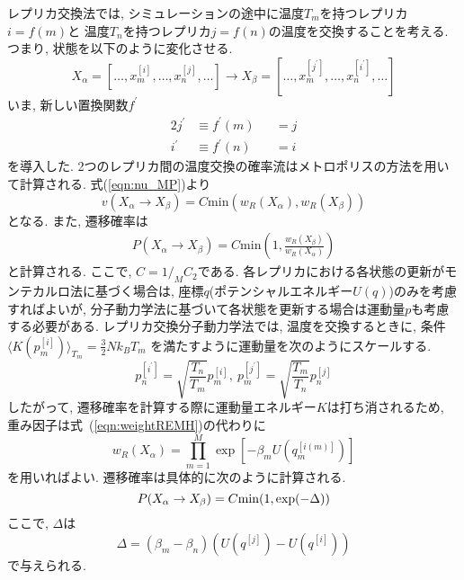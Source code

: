 レプリカ交換法では, シミュレーションの途中に温度$T_{m}$を持つレプリカ$i=f(m)$と
温度$T_{n}$を持つレプリカ$j=f(n)$の温度を交換することを考える.
つまり, 状態を以下のように変化させる.
\begin{equation}
  X_{\alpha} = [\dots, x_{m}^{[i]},\dots, x_{n}^{[j]}, \dots] \to
  X_{\beta}  = [\dots, x_{m}^{[j^{\prime}]},\dots, x_{n}^{[i^{\prime}]}, \dots]
\end{equation}
いま, 新しい置換関数$f^{\prime}$
\begin{alignat}{2}
 j^{\prime} &\equiv f^{\prime}(m) &&= j \\
 i^{\prime} &\equiv f^{\prime}(n) &&= i
\end{alignat}
を導入した.
2つのレプリカ間の温度交換の確率流はメトロポリスの方法を用いて計算される. 式(\ref{eqn:nu_MP})より
\begin{equation}
 v(X_{\alpha} \to X_{\beta}) = C \mathrm{min}(w_{R}(X_{\alpha}), w_{R}(X_{\beta}))
\end{equation}
となる. また, 遷移確率は
\begin{align}
 P(X_{\alpha} \to X_{\beta}) = C \mathrm{min} \left(1, \frac{w_{R}(X_{\beta})}{w_{R}(X_{\alpha})}\right)
\end{align}
と計算される. ここで, $C=1/_{M}C_{2}$である.
各レプリカにおける各状態の更新がモンテカルロ法に基づく場合は,
座標$q$(ポテンシャルエネルギー$U(q)$)のみを考慮すればよいが, 分子動力学法に基づいて各状態を更新する場合は運動量$p$も考慮する必要がある.
レプリカ交換分子動力学法では, 温度を交換するときに,
条件$\langle K(p_m^{[i]}) \rangle _{T_{m}} = \frac{3}{2}N k_{B} T_{m}$
を満たすように運動量を次のようにスケールする.
\begin{equation}
 p_{n}^{[i^{\prime}]} = \sqrt{\frac{T_n}{T_m}}p_{m}^{[i]},~  p_{m}^{[j^{\prime}]} = \sqrt{\frac{T_m}{T_n}}p_{n}^{[j]}
 \label{eqn:rescale}
\end{equation}
したがって, 遷移確率を計算する際に運動量エネルギー$K$は打ち消されるため, 重み因子は式~(\ref{eqn:weightREMH})の代わりに
\begin{equation}
 w_{R}(X_{\alpha}) = \prod_{m=1}^{M} \exp[-\beta_{m}U(q_{m}^{[i(m)]})] \label{eqn:weightREM}
\end{equation}
を用いればよい.
遷移確率は具体的に次のように計算される.
\begin{equation}
 P(X_{\alpha} \to X_{\beta}) = C \mathrm{min} (1,\exp(-\Delta)) \\ \label{eqn:PREM}
\end{equation}
ここで, $\Delta$は
\begin{equation}
 \Delta = (\beta_{m} - \beta_{n})(U(q^{[j]})-U(q^{[i]}))
\end{equation}
で与えられる.

